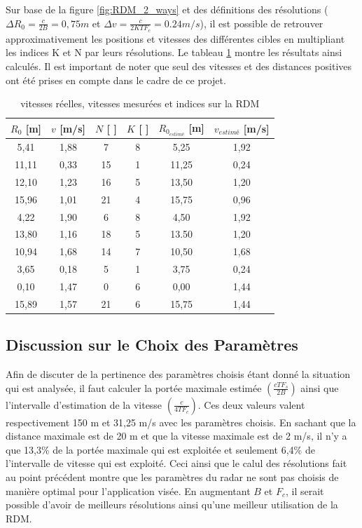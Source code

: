 Sur base de la figure \ref{fig:RDM_2_ways} et des définitions des résolutions ( $\Delta R_0 = \frac{c}{2B} = 0,75 m$ et $\Delta v = \frac{c}{2KTF_c} = 0.24 m/s$), il est possible de retrouver approximativement les positions et vitesses des différentes cibles en multipliant les indices K et N par leurs résolutions. Le tableau \ref{tab:results_calc_RDM} montre les résultats ainsi calculés. Il est important de noter que seul des vitesses et des distances positives ont été prises en compte dans le cadre de ce projet.  

\begin{table}[H]
    \centering
    \begin{tabular}{|c|c|c|c|c|c|}
    \hline
    \rowcolor[gray]{0.90} $R_0$ [m] &  $v$ [m/s] &  $N$ [ ] &  $K$ [ ] & $R_{0_{estimé}}$ [m] &  $v_{estimé}$ [m/s]  \\\hline
 5,41  & 1,88 & 7  & 8 & 5,25  & 1,92 \\\hline
 11,11 & 0,33 & 15 & 1 & 11,25 & 0,24 \\\hline
 12,10 & 1,23 & 16 & 5 & 13,50 & 1,20 \\\hline
 15,96 & 1,01 & 21 & 4 & 15,75 & 0,96 \\\hline
 4,22  & 1,90 & 6  & 8 & 4,50  & 1,92 \\\hline
 13,80 & 1,16 & 18 & 5 & 13.50 & 1,20 \\\hline
 10,94 & 1,68 & 14 & 7 & 10,50 & 1,68 \\\hline
 3,65  & 0,18 & 5  & 1 & 3,75  & 0,24 \\\hline
 0,10  & 1,47 & 0  & 6 & 0,00  & 1,44 \\\hline
 15,89 & 1,57 & 21 & 6 & 15,75 & 1,44 \\\hline
    \end{tabular}
    \caption{vitesses réelles, vitesses mesurées et indices sur la RDM}
    \label{tab:results_calc_RDM}
\end{table}

\subsection{Discussion sur le Choix des Paramètres}

Afin de discuter de la pertinence des paramètres choisis étant donné la situation qui est analysée, il faut calculer la portée maximale estimée $\left(\frac{cTF_s}{2B}\right)$  ainsi que l'intervalle d'estimation de la vitesse $\left(\frac{c}{4TF_c}\right)$. Ces deux valeurs valent respectivement 150 m et 31,25 m/s avec les paramètres choisis. En sachant que la distance maximale est de 20 m et que la vitesse maximale est de 2 m/s, il n'y a que 13,3\% de la portée maximale qui est exploitée et seulement 6,4\% de l'intervalle de vitesse qui est exploité. Ceci ainsi que le calul des résolutions fait au point précédent montre que les paramètres du radar ne sont pas choisis de manière optimal pour l'application visée. En augmentant $B$ et $F_c$, il serait possible d'avoir de meilleurs résolutions ainsi qu'une meilleur utilisation de la RDM. 
